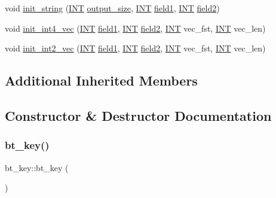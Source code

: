 \begin{DoxyCompactItemize}
\item 
void \mbox{\hyperlink{classbt__key_a37c5830aa6abd2f9892a649e1b5d4248}{init\+\_\+string}} (\mbox{\hyperlink{galois_8h_a09fddde158a3a20bd2dcadb609de11dc}{I\+NT}} \mbox{\hyperlink{classbt__key_acb48f95d030f62c56051d0cd6e013394}{output\+\_\+size}}, \mbox{\hyperlink{galois_8h_a09fddde158a3a20bd2dcadb609de11dc}{I\+NT}} \mbox{\hyperlink{classbt__key_af372b25947e954e2a67f59418b9d1f9f}{field1}}, \mbox{\hyperlink{galois_8h_a09fddde158a3a20bd2dcadb609de11dc}{I\+NT}} \mbox{\hyperlink{classbt__key_a8aea2dcc348cbece3e97a29012dc7ffd}{field2}})
\item 
void \mbox{\hyperlink{classbt__key_ac13cd9d95f812eeb86c70219905f16fd}{init\+\_\+int4\+\_\+vec}} (\mbox{\hyperlink{galois_8h_a09fddde158a3a20bd2dcadb609de11dc}{I\+NT}} \mbox{\hyperlink{classbt__key_af372b25947e954e2a67f59418b9d1f9f}{field1}}, \mbox{\hyperlink{galois_8h_a09fddde158a3a20bd2dcadb609de11dc}{I\+NT}} \mbox{\hyperlink{classbt__key_a8aea2dcc348cbece3e97a29012dc7ffd}{field2}}, \mbox{\hyperlink{galois_8h_a09fddde158a3a20bd2dcadb609de11dc}{I\+NT}} vec\+\_\+fst, \mbox{\hyperlink{galois_8h_a09fddde158a3a20bd2dcadb609de11dc}{I\+NT}} vec\+\_\+len)
\item 
void \mbox{\hyperlink{classbt__key_ac387752908d0de9d69246e19a3ae321d}{init\+\_\+int2\+\_\+vec}} (\mbox{\hyperlink{galois_8h_a09fddde158a3a20bd2dcadb609de11dc}{I\+NT}} \mbox{\hyperlink{classbt__key_af372b25947e954e2a67f59418b9d1f9f}{field1}}, \mbox{\hyperlink{galois_8h_a09fddde158a3a20bd2dcadb609de11dc}{I\+NT}} \mbox{\hyperlink{classbt__key_a8aea2dcc348cbece3e97a29012dc7ffd}{field2}}, \mbox{\hyperlink{galois_8h_a09fddde158a3a20bd2dcadb609de11dc}{I\+NT}} vec\+\_\+fst, \mbox{\hyperlink{galois_8h_a09fddde158a3a20bd2dcadb609de11dc}{I\+NT}} vec\+\_\+len)
\end{DoxyCompactItemize}
\subsection*{Additional Inherited Members}


\subsection{Constructor \& Destructor Documentation}
\mbox{\label{classbt__key_a711cbed5ca8722346862b155d6f2cb3e}} 
\subsubsection{\texorpdfstring{bt\+\_\+key()}{bt\_key()}\hspace{0.1cm}{\footnotesize\ttfamily [1/2]}}
{\footnotesize\ttfamily bt\+\_\+key\+::bt\+\_\+key (\begin{DoxyParamCaption}{ }\end{DoxyParamCaption})}

